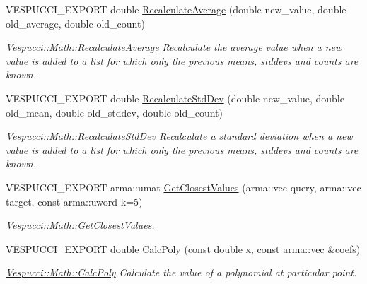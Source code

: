 \begin{DoxyCompactItemize}
\item 
V\+E\+S\+P\+U\+C\+C\+I\+\_\+\+E\+X\+P\+O\+RT double \hyperlink{namespace_vespucci_1_1_math_acb3549757968bb5b450a79ffce951cad}{Recalculate\+Average} (double new\+\_\+value, double old\+\_\+average, double old\+\_\+count)
\begin{DoxyCompactList}\small\item\em \hyperlink{namespace_vespucci_1_1_math_acb3549757968bb5b450a79ffce951cad}{Vespucci\+::\+Math\+::\+Recalculate\+Average} Recalculate the average value when a new value is added to a list for which only the previous means, stddevs and counts are known. \end{DoxyCompactList}\item 
V\+E\+S\+P\+U\+C\+C\+I\+\_\+\+E\+X\+P\+O\+RT double \hyperlink{namespace_vespucci_1_1_math_ab450596ed05ccd89c5183bd57ed1a0af}{Recalculate\+Std\+Dev} (double new\+\_\+value, double old\+\_\+mean, double old\+\_\+stddev, double old\+\_\+count)
\begin{DoxyCompactList}\small\item\em \hyperlink{namespace_vespucci_1_1_math_ab450596ed05ccd89c5183bd57ed1a0af}{Vespucci\+::\+Math\+::\+Recalculate\+Std\+Dev} Recalculate a standard deviation when a new value is added to a list for which only the previous means, stddevs and counts are known. \end{DoxyCompactList}\item 
V\+E\+S\+P\+U\+C\+C\+I\+\_\+\+E\+X\+P\+O\+RT arma\+::umat \hyperlink{namespace_vespucci_1_1_math_a506d2be5021d7acb6ec77c4a7526b62e}{Get\+Closest\+Values} (arma\+::vec query, arma\+::vec target, const arma\+::uword k=5)
\begin{DoxyCompactList}\small\item\em \hyperlink{namespace_vespucci_1_1_math_a506d2be5021d7acb6ec77c4a7526b62e}{Vespucci\+::\+Math\+::\+Get\+Closest\+Values}. \end{DoxyCompactList}\item 
V\+E\+S\+P\+U\+C\+C\+I\+\_\+\+E\+X\+P\+O\+RT double \hyperlink{namespace_vespucci_1_1_math_aa731c8ee08c627769a4cbe2d594c6907}{Calc\+Poly} (const double x, const arma\+::vec \&coefs)
\begin{DoxyCompactList}\small\item\em \hyperlink{namespace_vespucci_1_1_math_aa731c8ee08c627769a4cbe2d594c6907}{Vespucci\+::\+Math\+::\+Calc\+Poly} Calculate the value of a polynomial at particular point. \end{DoxyCompactList}\item 

\end{DoxyCompactItemize}

